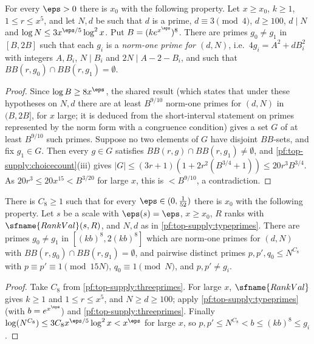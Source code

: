 \begin{lemma}\label{pf:top-supply:typeprimes}
For every $\eps>0$ there is $x_0$ with the following property. Let $x\ge x_0$, $k\ge1$, $1\le r\le x^5$, and let $N,d$ be such
that $d$ is a prime, $d\equiv3\pmod4$, $d\ge100$, $d\mid N$ and $\log N\le3x^{\eps/5}\log^2x$. Put $B=(ke^{x^\eps})^8$. There
are primes $g_0\ne g_1$ in $[B,2B]$ such that each $g_i$ is a \emph{norm-one prime for $(d,N)$}, i.e.\ $4g_i=A^2+dB_i^2$ with
integers $A,B_i$, $N\mid B_i$ and $2N\mid A-2-B_i$, and such that $BB(r,g_0)\cap BB(r,g_1)=\emptyset$.
 
\end{lemma}

\begin{proof}
Since $\log B\ge8x^\eps$, the shared result  (which states that under these hypotheses
on $N,d$ there are at least $B^{9/10}$ norm-one primes for $(d,N)$ in $(B,2B]$, for $x$ large; it is deduced from the
short-interval statement  on primes represented by the norm form with a congruence
condition) gives a set $G$ of at least $B^{9/10}$ such primes. Suppose no two elements of $G$ have disjoint $BB$-sets, and fix
$g_1\in G$. Then every $g\in G$ satisfies $BB(r,g)\cap BB(r,g_1)\ne\emptyset$, and \cref{pf:top-supply:choicecount}(iii) gives
$|G|\le(3r+1)(1+2r^2(B^{3/4}+1))\le20r^3B^{3/4}$. As $20r^3\le20x^{15}<B^{3/20}$ for large $x$, this is $<B^{9/10}$, a
contradiction.
\end{proof}

\begin{lemma}\label{pf:top-supply:leveldata}
There is $C_8\ge1$ such that for every $\eps\in(0,\frac1{52})$ there is $x_0$ with the following property. Let $s$ be a scale
with $\eps(s)=\eps$, $x\ge x_0$, $R$ ranks with $\sfname{RankVal}(s,R)$, and $N,d$ as in \cref{pf:top-supply:typeprimes}. There
are primes $g_0\ne g_1$ in $[(kb)^8,2(kb)^8]$ which are norm-one primes for $(d,N)$ with $BB(r,g_0)\cap BB(r,g_1)=\emptyset$, and
pairwise distinct primes $p,p',q_0\le N^{C_8}$ with $p\equiv p'\equiv1\pmod{15N}$, $q_0\equiv1\pmod N$, and $p,p'\ne g_i$.
\end{lemma}

\begin{proof}
Take $C_8$ from \cref{pf:top-supply:threeprimes}. For large $x$, $\sfname{RankVal}$ gives $k\ge1$ and $1\le r\le x^5$, and
$N\ge d\ge100$; apply \cref{pf:top-supply:typeprimes} (with $b=e^{x^\eps}$) and \cref{pf:top-supply:threeprimes}. Finally
$\log(N^{C_8})\le3C_8x^{\eps/5}\log^2x<x^\eps$ for large $x$, so $p,p'\le N^{C_8}<b\le(kb)^8\le g_i$.
\end{proof}

